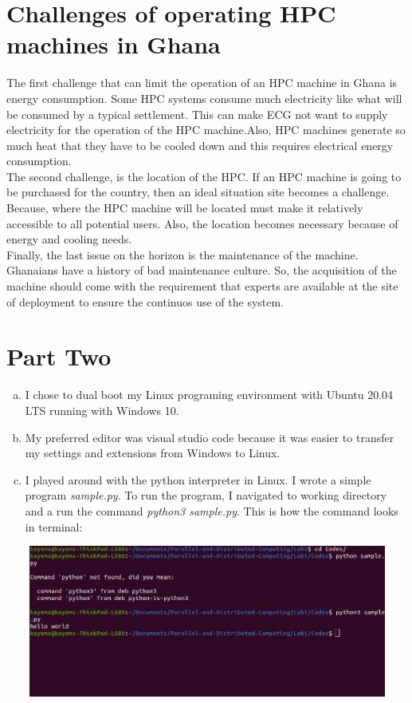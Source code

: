 \documentclass[12pt, a4paper, fleqn, titlepage]{article}
\begin{document}
    

\section{Challenges of operating HPC machines in Ghana}
    
        The first challenge that can limit the operation of an HPC machine in Ghana is energy consumption. Some HPC systems consume much electricity like what will be consumed by a typical settlement. This can make ECG not want to supply electricity for the operation of the HPC machine.Also, HPC machines generate so much heat that they have to be cooled down and this requires electrical energy consumption.\\
        The second challenge, is the location of the HPC. If an HPC machine is going to be purchased for the country, then an ideal situation site becomes a challenge. Because, where the HPC machine will be located must make it relatively accessible to all potential users. Also, the location becomes necessary because of energy and cooling needs.\\
        Finally, the last issue on the horizon is the maintenance of the machine. Ghanaians have a history of bad maintenance culture. So, the acquisition of the machine should come with the requirement that experts are available at the site of deployment to ensure the continuos use of the system.
    

\section{Part Two}
    \begin{enumerate}[a.]
        \item I chose to dual boot my Linux programing environment with Ubuntu 20.04 LTS running with Windows 10.
        \item My preferred editor was visual studio code because it was easier to transfer my settings and extensions from Windows to Linux.
        \item I played around with the python interpreter in Linux. I wrote a simple program \emph{sample.py}. To run the program, I navigated to working directory and a run the command \emph{python3 sample.py}. This is how the command looks in terminal:
    \end{enumerate}

    \begin{center}
        \includegraphics[width= 20cm,height = 5cm, keepaspectratio,scale=0.8]{py}
    \end{center}
        
\end{document}
